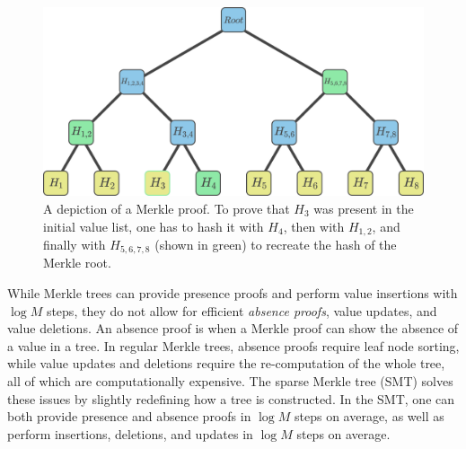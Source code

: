 \documentclass{article}
\begin{document}
\begin{figure}[h]
\centering\includegraphics[width=0.5\linewidth]{figures/merkle_proof.png}
\caption{A depiction of a Merkle proof. To prove that $H_3$ was present in the initial value list, one has to hash it with $H_4$, then with $H_{1,2}$, and finally with $H_{5,6,7,8}$ (shown in green) to recreate the hash of the Merkle root.}
\label{fig:Merkle_proof}
\end{figure}

While Merkle trees can provide presence proofs and perform value insertions with $\log{M}$ steps, they do not allow for efficient \textit{absence proofs}, value updates, and value deletions. An absence proof is when a Merkle proof can show the absence of a value in a tree. In regular Merkle trees, absence proofs require leaf node sorting, while value updates and deletions require the re-computation of the whole tree, all of which are computationally expensive. The sparse Merkle tree (SMT) solves these issues by slightly redefining how a tree is constructed. In the SMT, one can both provide presence and absence proofs in $\log{M}$ steps on average, as well as perform insertions, deletions, and updates in $\log{M}$ steps on average.
\end{document}
